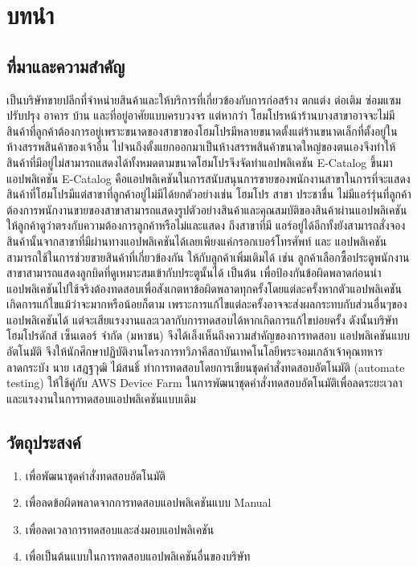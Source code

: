 \chapter{บทนำ}
\thispagestyle{empty}
\label{chapter:introduction}

\section{ที่มาและความสำคัญ}
    {\Company} เป็นบริษัทขายปลีกที่จำหน่ายสินค้าและให้บริการที่เกี่ยวข้องกับการก่อสร้าง ตกแต่ง ต่อเติม ซ่อมแซม ปรับปรุง อาคาร บ้าน และที่อยู่อาศัยแบบครบวงจร
    แต่หากว่า โฮมโปรหน้าร้านบางสาขาอาจจะไม่มีสินค้าที่ลูกค้าต้องการอยู่เพราะขนาดของสาขาของโฮมโปรมีหลายขนาดตั้งแต่ร้านขนาดเล็กที่ตั้งอยู่ในห้างสรรพสินค้าของเจ้าอื่น
    ไปจนถึงตั้งแยกออกมาเป็นห้างสรรพสินค้าขนาดใหญ่ของตนเองจึงทำให้สินค้าที่มีอยู่ไม่สามารถแสดงได้ทั้งหมดตามขนาดโฮมโปรจึงจัดทำแอปพลิเคชัน E-Catalog ขึ้นมา
    แอปพลิเคชัน E-Catalog คือแอปพลิเคชันในการสนับสนุนการขายของพนักงานสาขาในการที่จะแสดงสินค้าที่โฮมโปรมีแต่สาขาที่ลูกค้าอยู่ไม่มีได้ยกตัวอย่างเช่น โฮมโปร
    สาขา ประชาชื่น ไม่มีแอร์รุ่นที่ลูกค้าต้องการพนักงานขายของสาขาสามารถแสดงรูปตัวอย่างสินค้าและคุณสมบัติของสินค้าผ่านแอปพลิเคชันให้ลูกค้าดูว่าตรงกับความต้องการลูกค้าหรือไม่และแสดง
    ถึงสาขาที่มี แอร์อยู่ได้อีกทั้งยังสามารถสั่งจองสินค้านั้นจากสาขาที่มีผ่านทางแอปพลิเคชันได้เลยเพียงแค่กรอกเบอร์โทรศัพท์ และ แอปพลิเคชันสามารถใช้ในการช่วยขายสินค้าที่เกี่ยวข้องกัน
    ให้กับลูกค้าเพิ่มเติมได้ เช่น ลูกค้าเลือกซื้อประตูพนักงานสาขาสามารถแสดงลูกบิดที่ดูเหมาะสมเข้ากับประตูนั้นได้ เป็นต้น
    เพื่อป้องกันข้อผิดพลาดก่อนนำแอปพลิเคชันไปใช้จริงต้องทดสอบเพื่อสังเกตหาข้อผิดพลาดทุกครั้งโดยแต่ละครั้งหากตัวแอปพลิเคชันเกิดการแก้ไขแม้ว่าจะมากหรือน้อยก็ตาม
    เพราะการแก้ไขแต่ละครั้งอาจจะส่งผลกระทบกับส่วนอื่นๆของแอปพลิเคชันได้ แต่จะเสียแรงงานและเวลากับการทดสอบได้หากเกิดการแก้ไขบ่อยครั้ง
    ดังนั้นบริษัท โฮมโปรดักส์ เซ็นเตอร์ จํากัด (มหาชน) จึงได้เล็งเห็นถึงความสําคัญของการทดสอบ
    แอปพลิเคชันแบบอัตโนมัติ จึงให้นักศึกษาปฏิบัติงานโครงการทวิภาคีสถาบันเทคโนโลยีพระจอมเกล้าเจ้าคุณทหารลาดกระบัง นาย เสฎฐวุฒิ ไม้สนธิ์ ทำการทดสอบโดยการเขียนชุดคำสั่งทดสอบอัตโนมัติ (automate testing) ให้ใช้คู่กับ AWS Device Farm
    ในการพัฒนาชุดคำสั่งทดสอบอัตโนมัติเพื่อลดระยะเวลาและแรงงานในการทดสอบแอปพลิเคชันแบบเดิม

\section{วัตถุประสงค์}
    \begin{enumerate}
        \item เพื่อพัฒนาชุดคำสั่งทดสอบอัตโนมัติ
        \item เพื่อลดข้อผิดพลาดจากการทดสอบแอปพลิเคชันแบบ Manual
        \item เพื่อลดเวลาการทดสอบและส่งมอบแอปพลิเคชัน
        \item เพื่อเป็นต้นแบบในการทดสอบแอปพลิเคชันอื่นของบริษัท
    \end{enumerate}

